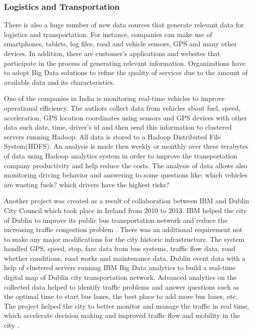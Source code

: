 \documentclass[runningheads]{llncs}
\begin{document}
\subsubsection{Logistics and Transportation}

There is also a huge number of new data sources that generate relevant data for logistics and transportation. For instance, companies can make use of smartphones, tablets, log files, road and vehicle sensors, GPS and many other devices. In addition, there are customer's applications and websites that participate in the process of generating relevant information. Organizations have to adopt Big Data solutions to refine the quality of services due to the amount of available data and its characteristics.

One of the companies in India is monitoring real-time vehicles to improve operational efficiency. The authors collect data from vehicles about fuel, speed, acceleration, GPS location coordinates using sensors and GPS devices with other data such date, time, driver's id and then send this information to clustered servers running Hadoop. All data is stored to a Hadoop Distributed File System(HDFS). An analysis is made then weekly or monthly over these terabytes of data using Hadoop analytics system in order to improve the transportation company productivity and help reduce the costs. The analysis of data allows also monitoring driving behavior and answering to some questions like: which vehicles are wasting fuels? which drivers have the highest risks? \cite{TRANSPORT}

Another project was created as a result of collaboration between IBM and Dublin City Council which took place in Ireland from 2010 to 2013. IBM helped the city of Dublin to improve its public bus transportation network and reduce the increasing traffic congestion problem \cite{TRANSPORTREPORT}. There was an additional requirement not to make any major modifications for the city historic infrastructure. The system handled GPS, speed, stop, fare data from bus systems, traffic flow data, road whether conditions, road works and maintenance data, Dublin event data with a help of clustered servers running IBM Big Data analytics to build a real-time digital map of Dublin city transportation network. Advanced analytics on the collected data helped to identify traffic problems and answer questions such as the optimal time to start bus lanes, the best place to add more bus lanes, etc. The project helped the city to better monitor and manage the traffic in real time, which accelerate decision making and improved traffic flow and mobility in the city \cite{TRANSPORT}. 
\end{document}
